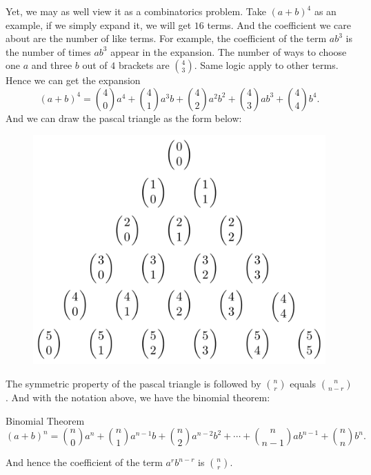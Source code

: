 \begin{mysubsection}{}
    Yet, we may as well view it as a combinatorics problem. Take $(a+b)^4$ as an example, if we simply expand it, we will get $16$ terms. And the coefficient we care about are the number of like terms. For example, the coefficient of the term $ab^3$ is the number of times $ab^3$ appear in the expansion. The number of ways to choose one $a$ and three $b$ out of $4$ brackets are ${4\choose 3}$. Same logic apply to other terms. Hence we can get the expansion
    \[(a+b)^4={4\choose 0}a^4+{4\choose 1}a^3b+{4\choose 2}a^2b^2+{4\choose 3}ab^3+{4\choose 4}b^4.\]
    And we can draw the pascal triangle as the form below:
    \begin{figure}[H]
        \centering
        \includegraphics[width=.5\linewidth]{./co3_pic/PascalTriangleNCR.png}
    \end{figure}
    The symmetric property of the pascal triangle is followed by ${n\choose r}$ equals ${n\choose n-r}$. And with the notation above, we have the binomial theorem:

    \begin{theorem}[thm:]{Binomial Theorem}
        \[(a+b)^n={n\choose 0}a^n+{n\choose 1}a^{n-1}b+{n\choose 2}a^{n-2}b^2+\cdots +{n\choose n-1}ab^{n-1}+{n\choose n}b^n.\]
    \end{theorem}

    And hence the coefficient of the term $a^rb^{n-r}$ is ${n\choose r}$.
\end{mysubsection}

